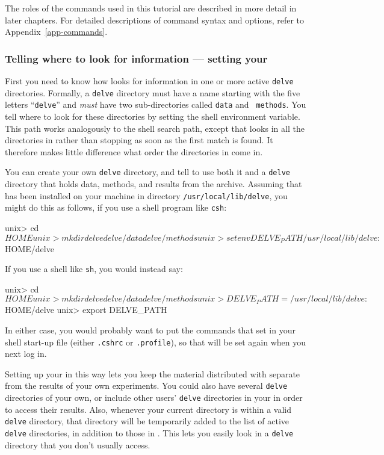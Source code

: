 The roles of the \delve{} commands used in this tutorial are described
in more detail in later chapters.  For detailed descriptions of 
command syntax and options, refer to Appendix~\ref{app-commands}.


\subsubsection*{Telling \delve{} where to look for information --- setting your
                \delvepath{}}

First you need to know how \delve{} looks for information in one or
more active \texttt{delve} directories. Formally, a \texttt{delve} directory
must have a name starting with the five letters ``\texttt{delve}'' and
{\em must\/} have two sub-directories called \texttt{data} and {\tt
methods}. You tell \delve{} where to look for these directories by
setting the \delvepath{} shell environment variable. This path works
analogously to the shell search path, except that \delve{} looks in
all the directories in \delvepath{} rather than stopping as soon as
the first match is found.  It therefore makes little difference what
order the directories in \delvepath{} come in.

You can create your own \texttt{delve} directory, and tell \delve{} to
use both it and a \texttt{delve} directory that holds data, methods, and
results from the \delve{} archive.  Assuming that \delve{} has been
installed on your machine in directory \texttt{/usr/local/lib/delve}, you
might do this as follows, if you use a shell program like \texttt{csh}:

\begin{Session}
unix> cd $HOME
unix> mkdir delve delve/data delve/methods
unix> setenv DELVE_PATH /usr/local/lib/delve:$HOME/delve
\end{Session}

If you use a shell like \texttt{sh}, you would instead say:

\begin{Session}
unix> cd $HOME
unix> mkdir delve delve/data delve/methods
unix> DELVE_PATH=/usr/local/lib/delve:$HOME/delve
unix> export DELVE_PATH
\end{Session}

In either case, you would probably want to put the commands that set
\delvepath{} in your shell start-up file (either \texttt{.cshrc} or 
\texttt{.profile}), so that \delvepath{} will be set again when you next
log in.

Setting up your \delvepath{} in this way lets you keep the material
distributed with \delve{} separate from the results of your own
experiments.  You could also have several \texttt{delve} directories of
your own, or include other users' \texttt{delve} directories in your
\delvepath{} in order to access their results.  Also, whenever your
current directory is within a valid \texttt{delve} directory, that
directory will be temporarily added to the list of active \texttt{delve}
directories, in addition to those in \delvepath{}.  This lets you
easily look in a \texttt{delve} directory that you don't usually access.

